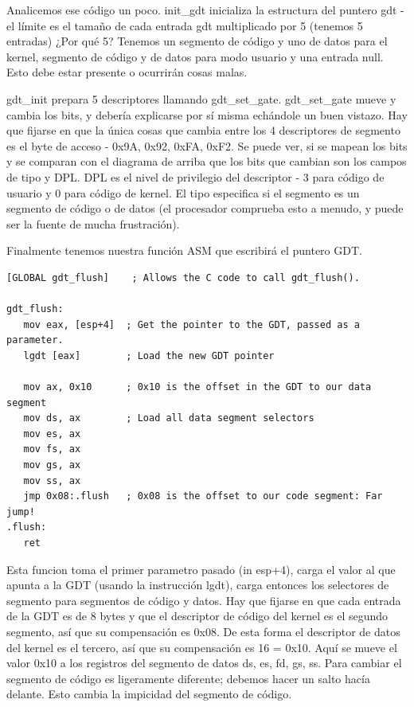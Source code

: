 \documentclass{report}
\begin{document}
Analicemos ese código un poco. init\_gdt inicializa la estructura del puntero gdt - el límite es el tamaño de cada entrada gdt multiplicado por 5 (tenemos 5 entradas) ¿Por qué 5? Tenemos un segmento de código y uno de datos para el kernel, segmento de código y de datos para modo usuario y una entrada null. Esto debe estar presente o ocurrirán cosas malas.

gdt\_init prepara 5 descriptores llamando gdt\_set\_gate. gdt\_set\_gate mueve y cambia los bits, y debería explicarse por sí misma echándole un buen vistazo. Hay que fijarse en que la única cosas que cambia entre los 4 descriptores de segmento es el byte de acceso - 0x9A, 0x92, 0xFA, 0xF2. Se puede ver, si se mapean los bits y se comparan con el diagrama de arriba que los bits que cambian son los campos de tipo y DPL. DPL es el nivel de privilegio del descriptor - 3 para código de usuario y 0 para código de kernel. El tipo especifica si el segmento es un segmento de código o de datos (el procesador comprueba esto a menudo, y puede ser la fuente de mucha frustración).

Finalmente tenemos nuestra función ASM que escribirá el puntero GDT.

\begin{lstlisting}
[GLOBAL gdt_flush]    ; Allows the C code to call gdt_flush().

gdt_flush:
   mov eax, [esp+4]  ; Get the pointer to the GDT, passed as a parameter.
   lgdt [eax]        ; Load the new GDT pointer

   mov ax, 0x10      ; 0x10 is the offset in the GDT to our data segment
   mov ds, ax        ; Load all data segment selectors
   mov es, ax
   mov fs, ax
   mov gs, ax
   mov ss, ax
   jmp 0x08:.flush   ; 0x08 is the offset to our code segment: Far jump!
.flush:
   ret
\end{lstlisting}

Esta funcion toma el primer parametro pasado (in esp+4), carga el valor al que apunta a la GDT (usando la instrucción lgdt), carga entonces los selectores de segmento para segmentos de código y datos. Hay que fijarse en que cada entrada de la GDT es de 8 bytes y que el descriptor de código del kernel es el segundo segmento, así que su compensación es 0x08. De esta forma el descriptor de datos del kernel es el tercero, así que su compensación es 16 = 0x10. Aquí se mueve el valor 0x10 a los registros del segmento de datos ds, es, fd, gs, ss. Para cambiar el segmento de código es ligeramente diferente; debemos hacer un salto hacía delante. Esto cambia la impicidad del segmento de código.
\end{document}

